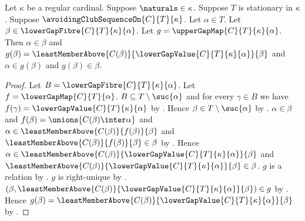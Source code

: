 \begin{proposition}\label{upper_gap_map_value_properties}
    Let $\kappa$ be a regular cardinal.
    Suppose $\naturals\in\kappa$.
    Suppose $T$ is stationary in $\kappa$.
    Suppose $\avoidingClubSequenceOn{C}{T}{\kappa}$.
    Let $\alpha\in T$.
    Let $\beta\in\lowerGapFibre{C}{T}{\kappa}{\alpha}$.
    Let $g=\upperGapMap{C}{T}{\kappa}{\alpha}$.
    Then $\alpha\in\beta$ and
        $g(\beta)=\leastMemberAbove{C(\beta)}
            {\lowerGapValue{C}{T}{\kappa}{\alpha}}{\beta}$ and
        $\alpha\in g(\beta)$ and $g(\beta)\in\beta$.
\end{proposition}
\begin{proof}
    Let $B=\lowerGapFibre{C}{T}{\kappa}{\alpha}$.
    Let $f=\lowerGapMap{C}{T}{\alpha}$.
    $B\subseteq T\setminus\suc{\alpha}$ and
        for every $\gamma\in B$ we have
            $f(\gamma)=\lowerGapValue{C}{T}{\kappa}{\alpha}$
        by .
    Hence $\beta\in T\setminus\suc{\alpha}$ by .
    $\alpha\in\beta$ and
        $f(\beta)=\unions{C(\beta)\inter\alpha}$ and
        $\alpha\in\leastMemberAbove{C(\beta)}{f(\beta)}{\beta}$ and
        $\leastMemberAbove{C(\beta)}{f(\beta)}{\beta}\in\beta$
        by .
    Hence $\alpha\in\leastMemberAbove{C(\beta)}
            {\lowerGapValue{C}{T}{\kappa}{\alpha}}{\beta}$ and
        $\leastMemberAbove{C(\beta)}
            {\lowerGapValue{C}{T}{\kappa}{\alpha}}{\beta}\in\beta$.
    $g$ is a relation by .
    $g$ is right-unique
        by .
    $(\beta,\leastMemberAbove{C(\beta)}
        {\lowerGapValue{C}{T}{\kappa}{\alpha}}{\beta})\in g$
        by .
    Hence $g(\beta)=\leastMemberAbove{C(\beta)}
        {\lowerGapValue{C}{T}{\kappa}{\alpha}}{\beta}$
        by .
\end{proof}

